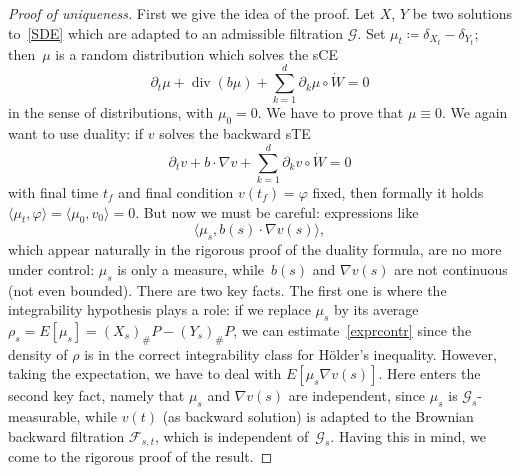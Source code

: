 \documentclass[a4paper,10pt]{article}
\newcommand\1{\mathbbm{1}}
\newcommand{\mc}{\mathcal}
\newcommand{\lan}{\langle}
\newcommand{\ran}{\rangle}
\DeclareMathOperator{\diverg}{div}
\numberwithin{equation}{section}
\begin{document}
\begin{proof}[Proof of uniqueness]
First we give the idea of the proof. Let $X$, $Y$ be two solutions to~\eqref{SDE} which are adapted to an admissible filtration $\mc{G}$. Set $\mu_t\coloneqq \delta_{X_t}-\delta_{Y_t}$; then~$\mu$ is a random distribution which solves the sCE
\begin{equation}
\partial_t\mu+\diverg(b\mu)+\sum^d_{k=1}\partial_k\mu\circ\dot{W}=0\label{sCE}
\end{equation}
in the sense of distributions, with $\mu_0=0$. We have to prove that $\mu\equiv0$. We again want to use duality: if $v$ solves the backward sTE
\begin{equation*}
\partial_t v +b\cdot\nabla v +\sum^d_{k=1}\partial_kv\circ\dot{W} =0
\end{equation*}
with final time $t_f$ and final condition $v(t_f)=\varphi$ fixed, then formally it holds $\lan \mu_t,\varphi\ran= \lan \mu_0,v_0\ran =0$. But now we must be careful: expressions like
\begin{equation}
\lan \mu_s,b(s) \cdot\nabla v(s)\ran,\label{exprcontr}
\end{equation}
which appear naturally in the rigorous proof of the duality formula, are no more under control: $\mu_s$ is only a measure, while~$b(s)$ and $\nabla v(s)$ are not continuous (not even bounded). There are two key facts. The first one is where the integrability hypothesis plays a role: if we replace $\mu_s$ by its average $\rho_s=E[\mu_s]=(X_s)_\#P-(Y_s)_\#P$, we can estimate~\eqref{exprcontr} since the density of $\rho$ is in the correct integrability class for H\"older's inequality. However, taking the expectation, we have to deal with $E[\mu_s\nabla v(s)]$. Here enters the second key fact, namely that $\mu_s$ and $\nabla v(s)$ are independent, since $\mu_s$ is $\mc{G}_s$-measurable, while $v(t)$ (as backward solution) is adapted to the Brownian backward filtration $\mc{F}_{s,t}$, which is independent of~$\mc{G}_s$. Having this in mind, we come to the rigorous proof of the result.


\end{proof}
\end{document}
